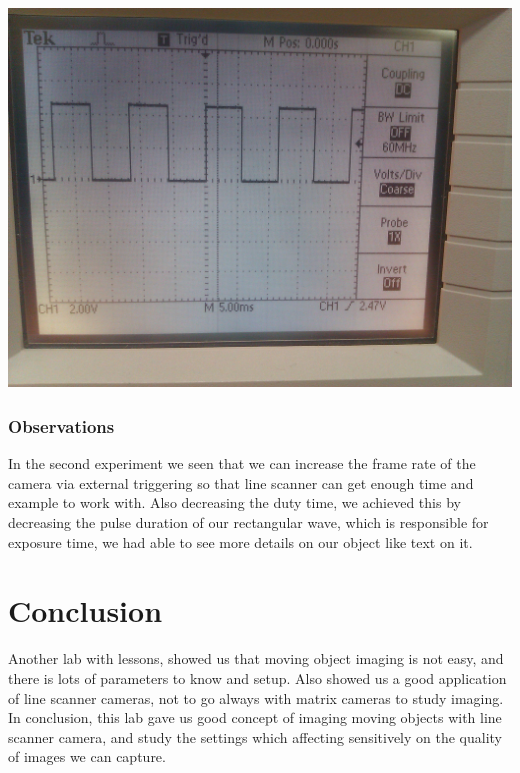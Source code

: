 \documentclass{article}
\begin{document}
	\begin{center}
	\includegraphics[scale=0.09]{signalPhoto.jpg}
	\end{center}
	
	\subsubsection{Observations}
	In the second experiment we seen that we can increase the frame rate of the camera via external triggering so that line scanner can get enough time and example to work with. Also decreasing the duty time, we achieved this by decreasing the pulse duration of our rectangular wave, which is responsible for exposure time, we had able to see more details on our object like text on it.
	
	
	
\section{Conclusion}
	Another lab with lessons, showed us that moving object imaging is not easy, and there is lots of parameters to know and setup. Also showed us a good application of line scanner cameras, not to go always with matrix cameras to study imaging. In conclusion, this lab gave us good concept of imaging moving objects with line scanner camera, and study the settings which affecting sensitively on the quality of images we can capture.
	
	
\end{document}
